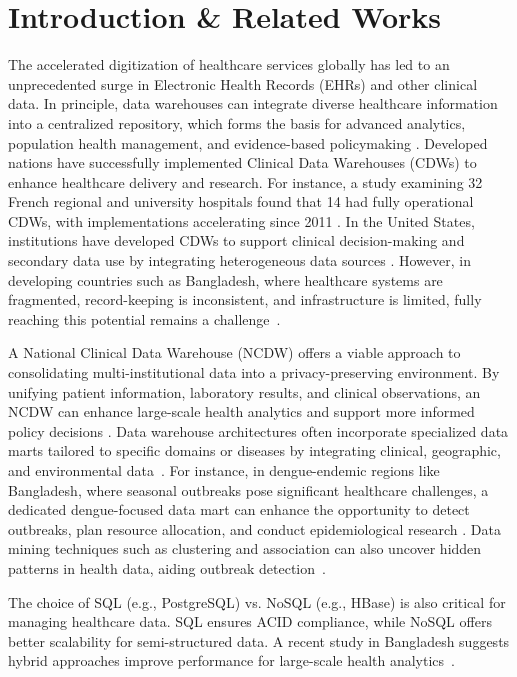 \section{Introduction \& Related Works}



The accelerated digitization of healthcare services globally has led to an unprecedented surge in Electronic Health Records (EHRs) and other clinical data. In principle, data warehouses can integrate diverse healthcare information into a centralized repository, which forms the basis for advanced analytics, population health management, and evidence-based policymaking \cite{evans2016electronic}. Developed nations have successfully implemented Clinical Data Warehouses (CDWs) to enhance healthcare delivery and research. For instance, a study examining 32 French regional and university hospitals found that 14 had fully operational CDWs, with implementations accelerating since 2011 \cite{France}. In the United States, institutions have developed CDWs to support clinical decision-making and secondary data use by integrating heterogeneous data sources \cite{Usa}. However, in developing countries such as Bangladesh, where healthcare systems are fragmented, record-keeping is inconsistent, and infrastructure is limited, fully reaching this potential remains a challenge~\cite{wisniewski2003development, 7400708}.

A National Clinical Data Warehouse (NCDW) offers a viable approach to consolidating multi-institutional data into a privacy-preserving environment. By unifying patient information, laboratory results, and clinical observations, an NCDW can enhance large-scale health analytics and support more informed policy decisions \cite{adewole2024systematic}. Data warehouse architectures often incorporate specialized data marts tailored to specific domains or diseases by integrating clinical, geographic, and environmental data~\cite{heinonen2019data}. For instance, in dengue-endemic regions like Bangladesh, where seasonal outbreaks pose significant healthcare challenges, a dedicated dengue-focused data mart can enhance the opportunity to detect outbreaks, plan resource allocation, and conduct epidemiological research \cite{kayesh2023increasing, mutsuddy2019dengue}. Data mining techniques such as clustering and association can also uncover hidden patterns in health data, aiding outbreak detection~\cite{han2012data, park2005design}.

The choice of SQL (e.g., PostgreSQL) vs. NoSQL (e.g., HBase) is also critical for managing healthcare data. SQL ensures ACID compliance, while NoSQL offers better scalability for semi-structured data. A recent study in Bangladesh suggests hybrid approaches improve performance for large-scale health analytics~\cite{khan2015development}.

